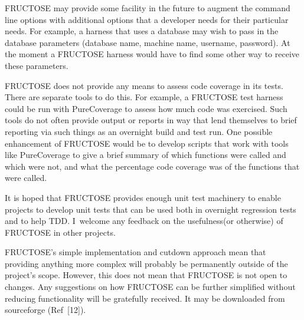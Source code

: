 \documentclass{book}
\begin{document}
FRUCTOSE may provide some facility in the future to augment
the command line options with additional options that a
developer needs for their particular needs. For example,
a harness that uses a database may wish to pass in the database
parameters (database name, machine name, username, password).
At the moment a FRUCTOSE harness would have to find some other
way to receive these parameters.

FRUCTOSE does not provide any means to assess code coverage
in its tests. There are separate tools to do this.
For example, a FRUCTOSE test harness could be run with
PureCoverage to assess how much code was exercised.
Such tools do not often provide output or reports in way
that lend themselves to brief reporting via such things
as an overnight build and test run.
One possible enhancement of FRUCTOSE would be to develop
scripts that work with tools like PureCoverage to give
a brief summary of which functions were called and which were
not, and what the percentage code coverage was of the functions
that were called.


It is hoped that FRUCTOSE provides enough unit test machinery 
to enable projects to develop unit tests that can be used both 
in overnight regression tests and to help TDD.
I~welcome any feedback on the usefulness(or otherwise) of
FRUCTOSE in other projects.

FRUCTOSE's simple implementation and cutdown approach
mean that providing anything more complex will probably be permanently
outside of the project's scope.
However, this does not mean that FRUCTOSE is not open to changes.
Any suggestions on how FRUCTOSE can be further simplified
without reducing functionality will be gratefully received.
It may be downloaded from sourceforge (Ref~[12]).

\end{document}
